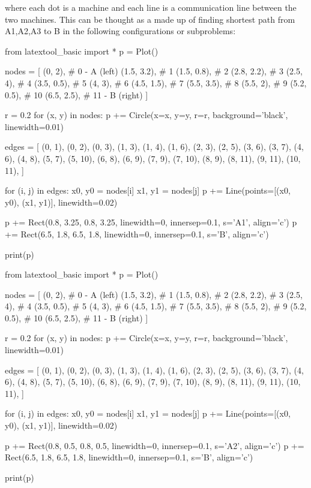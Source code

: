 where each dot is a machine and each line is a communication line
between the two machines. This can be thought as a made up of finding
shortest path from A1,A2,A3 to B in the following configurations or
subproblems:

\begin{python}
from latextool_basic import *
p = Plot()

nodes = [
    (0, 2),      # 0 - A (left)
    (1.5, 3.2),  # 1
    (1.5, 0.8),  # 2
    (2.8, 2.2),  # 3
    (2.5, 4),    # 4
    (3.5, 0.5),  # 5
    (4, 3),      # 6
    (4.5, 1.5),  # 7
    (5.5, 3.5),  # 8
    (5.5, 2),    # 9
    (5.2, 0.5),  # 10
    (6.5, 2.5),  # 11 - B (right)
]

r = 0.2
for (x, y) in nodes:
    p += Circle(x=x, y=y, r=r, background='black', linewidth=0.01)

edges = [
    (0, 1), (0, 2), (0, 3),
    (1, 3), (1, 4), (1, 6),
    (2, 3), (2, 5),
    (3, 6), (3, 7),
    (4, 6), (4, 8),
    (5, 7), (5, 10),
    (6, 8), (6, 9),
    (7, 9), (7, 10),
    (8, 9), (8, 11),
    (9, 11),
    (10, 11),
]

for (i, j) in edges:
    x0, y0 = nodes[i]
    x1, y1 = nodes[j]
    p += Line(points=[(x0, y0), (x1, y1)], linewidth=0.02)

p += Rect(0.8, 3.25, 0.8, 3.25, linewidth=0, innersep=0.1, s='A1', align='c')
p += Rect(6.5, 1.8, 6.5, 1.8, linewidth=0, innersep=0.1, s='B', align='c')

print(p)
\end{python}

\begin{python}
from latextool_basic import *
p = Plot()

nodes = [
    (0, 2),      # 0 - A (left)
    (1.5, 3.2),  # 1
    (1.5, 0.8),  # 2
    (2.8, 2.2),  # 3
    (2.5, 4),    # 4
    (3.5, 0.5),  # 5
    (4, 3),      # 6
    (4.5, 1.5),  # 7
    (5.5, 3.5),  # 8
    (5.5, 2),    # 9
    (5.2, 0.5),  # 10
    (6.5, 2.5),  # 11 - B (right)
]

r = 0.2
for (x, y) in nodes:
    p += Circle(x=x, y=y, r=r, background='black', linewidth=0.01)

edges = [
    (0, 1), (0, 2), (0, 3),
    (1, 3), (1, 4), (1, 6),
    (2, 3), (2, 5),
    (3, 6), (3, 7),
    (4, 6), (4, 8),
    (5, 7), (5, 10),
    (6, 8), (6, 9),
    (7, 9), (7, 10),
    (8, 9), (8, 11),
    (9, 11),
    (10, 11),
]

for (i, j) in edges:
    x0, y0 = nodes[i]
    x1, y1 = nodes[j]
    p += Line(points=[(x0, y0), (x1, y1)], linewidth=0.02)

p += Rect(0.8, 0.5, 0.8, 0.5, linewidth=0, innersep=0.1, s='A2', align='c')
p += Rect(6.5, 1.8, 6.5, 1.8, linewidth=0, innersep=0.1, s='B', align='c')

print(p)
\end{python}

